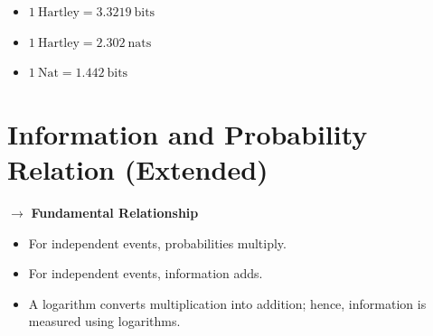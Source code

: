 \documentclass[11pt,a4paper]{book}
\newenvironment{infobox}[1][Information]{
    \begin{tcolorbox}[
        enhanced,
        breakable,
        colback=mintgreen!10,
        colframe=mintgreen!200,
        title=#1,
        fonttitle=\bfseries,
        sharp corners,
        boxrule=0.8pt,
        left=8pt,
        right=8pt,
        top=6pt,
        bottom=6pt
    ]
}{
    \end{tcolorbox}
}
\begin{document}
\begin{infobox}[Final Conversion Results]
\begin{itemize}
    \item \(1~\text{Hartley} = 3.3219~\text{bits}\)
    \item \(1~\text{Hartley} = 2.302~\text{nats}\)
    \item \(1~\text{Nat} = 1.442~\text{bits}\)
\end{itemize}
\end{infobox}

\section{Information and Probability Relation (Extended)}

\noindent $\rightarrow$ \textbf{Fundamental Relationship}
\begin{itemize}
    \item For independent events, probabilities multiply.
    \item For independent events, information adds.
    \item A logarithm converts multiplication into addition; hence, information is measured using logarithms.
\end{itemize}
\end{document}
